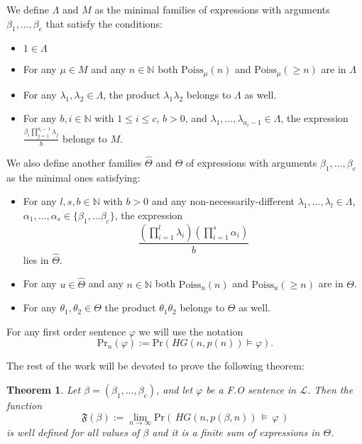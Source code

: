 \documentclass[11pt,notitlepage,a4paper]{article}
\newtheorem{theorem}{Theorem}[section]
\theoremstyle{definition}
\newcommand{\N}{\mathbb{N}}
\newcommand{\Ln}{\lim\limits_{n\to \infty}}
\begin{document}
We define $\Lambda$ and $M$ as the minimal families
of expressions with arguments $\beta_1,\dots, \beta_c$ that satisfy the conditions:
\begin{itemize}
	\item $1\in \Lambda$
	\item For any $\mu\in M$ and any $n\in \N$ both
	$\mathrm{Poiss}_{\mu}(n)$ and $\mathrm{Poiss}_\mu(\geq n)$ are in $\Lambda$
	\item For any $\lambda_1,\lambda_2 \in \Lambda$, the
	product $\lambda_1\lambda_2$ belongs to $\Lambda$ as well.
	\item For any $b,i\in \N$ with $1\leq i \leq c$,
	$b > 0$, and $\lambda_1,\dots, \lambda_{a_i-1}\in \Lambda$,
	the expression $\frac{\beta_i \prod_{j=1}^{a_i-1}\lambda_j}{b}$
	belongs to $M$.		
\end{itemize}
We also define another families $\widehat{\Theta}$ and $\Theta$ of expressions with arguments
$\beta_1,\dots, \beta_c$ as the minimal ones satisfying:
\begin{itemize}
	\item For any $l,s,b\in \N$ with $b>0$ and any 
	non-necessarily-different $\lambda_1,\dots, \lambda_l\in \Lambda$,
	$\alpha_1,\dots,\alpha_s\in \{\beta_1,\dots \beta_c\}$,
	the expression 
	\[\frac{\left(\prod_{i=1}^{l} \lambda_i \right)
		\left( \prod_{i=1}^{s}\alpha_i \right)}{b}\] 
	lies in $\widehat{\Theta}$.
	\item For any $u\in \widehat{\Theta}$ and any $n\in \N$ both
	$\mathrm{Poiss}_u(n)$ and $\mathrm{Poiss}_u(\geq n)$ are in $\Theta$.
	\item For any $\theta_1, \theta_2\in \Theta$ the product
	$\theta_1\theta_2$ belongs to $\Theta$ as well.
\end{itemize}
\vspace{1 em}

For any first order sentence $\varphi$
we will use the notation 
\[\mathrm{Pr}_n(\varphi):=\mathrm{Pr}(HG(n,p(n))\models \varphi).\]
\par

The rest of the work will be devoted to prove the following theorem:

\begin{theorem}\label{thm:THEONE} 
	Let $\beta=(\beta_1,\dots, \beta_c)$, and let $\varphi$ be a 
	F.O sentence in $\mathcal{L}$. Then the function
	\[
	\mathfrak{F}(\beta):=\Ln \mathrm{Pr}(\, HG(n,p(\beta,n))\, \models \, \varphi \,)
	\]
	is well defined for all values of $\beta$ and it is a finite sum 
	of expressions in $\Theta$.
\end{theorem}
\end{document}
